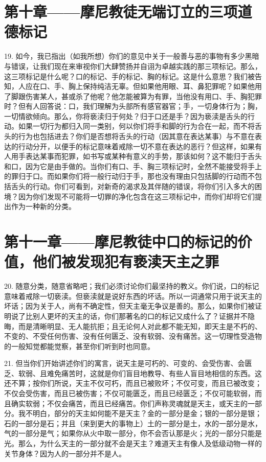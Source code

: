 
\section{第十章——摩尼教徒无端订立的三项道德标记}

19. 如今，我已指出（如我所想）你们的意见中关于一般善与恶的事物有多少黑暗与错误，让我们现在来审视你们大肆赞扬并自诩为卓越实践的那三项标记。那么，这三项标记是什么呢？口的标记、手的标记、胸的标记。这是什么意思？我们被告知，人应在口、手、胸上保持纯洁无辜。但如果他用眼、耳、鼻犯罪呢？如果他用了脚跟伤害某人，甚或杀了他呢？他怎能被算为有罪，当他没有用口、手、胸犯罪时？但有人回答说：口，我们理解为头部所有感官器官；手，一切身体行为；胸，一切情欲倾向。那么，你将亵渎归于何处？归于口还是手？因为亵渎是舌头的行动。如果一切行为都归入同一类别，何以你们将手和脚的行为合在一起，而不将舌头的行为也包括进去？你们是否想将舌头的行动（因其意在表达某事）与不意在表达的行动分开，以便手的标记意味着戒除一切不意在表达的恶行？但这样，如果有人用手表达某事而犯罪，如书写或某种有意义的手势，那该如何？这不能归于舌头和口，因为它是由手做的。当你们有口、手、胸三项标记时，全然不能接受将手上的罪归于口。而如果你们将一般行动归于手，那也没有理由只包括脚的行动而不包括舌头的行动。你们可看到，对新奇的渴求及其伴随的错误，将你们引入多大的困境？因为你们发现不可能将一切罪的净化包含在这三项标记中，而你们却将它们提出作为一种新的分类。\par


\section{第十一章——摩尼教徒中口的标记的价值，他们被发现犯有亵渎天主之罪}

20. 随意分类，随意省略吧；我们必须讨论你们最坚持的教义。你们说，口的标记意味着戒除一切亵渎。但亵渎就是说好东西的坏话。所以一词通常只用于说天主的坏话；因为关于人，尚有不确定性，但天主毫无争议是善的。那么，如果你们被证明说了比别人更坏的天主的话，你们那著名的口的标记又成什么了？证据并不隐晦，而是清晰明显、无人能抗拒；且无论何人对此都不能无知，即天主是不朽的、不变的、不受任何伤害、没有任何匮乏、没有软弱、没有痛苦。这一切理性受造物的一般知觉都能觉察，甚至你们听到时也同意。\par

21. 但当你们开始讲述你们的寓言，说天主是可朽的、可变的、会受伤害、会匮乏、软弱、且难免痛苦时，这就是你们盲目地教导、有些人盲目地相信的东西。这还不算；按你们所说，天主不仅可朽，而且已被败坏；不仅可变，而且已被改变；不仅会受伤害，而且已被伤害；不仅可能匮乏，而且已经匮乏；不仅可能软弱，而且确实软弱；不仅会痛苦，而且已经痛苦。你们声称灵魂就是天主，或天主的一部分。我不明白，部分的天主如何能不是天主？金的一部分是金；银的一部分是银；石的一部分是石；并且（来到更大的事物上）土的一部分是土，水的一部分是水，气的一部分是气；如果你从火中取一部分，你不会否认那是火；光的一部分只能是光。那么，为什么天主的一部分就不会是天主？难道天主有像人及低级动物一样的关节身体？因为人的一部分并不是人。\par

